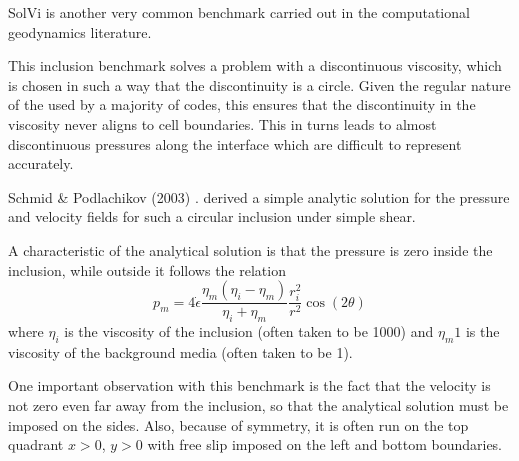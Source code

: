 SolVi is another very common benchmark carried out in the computational 
geodynamics literature.

This inclusion benchmark solves a problem with a discontinuous viscosity, 
which is chosen in such a way that the discontinuity is a circle. 
Given the regular nature of the used by a majority of codes, 
this ensures that the discontinuity in the viscosity never aligns to cell boundaries.
This in turns leads to almost discontinuous pressures along the interface which are difficult 
to represent accurately.

Schmid \& Podlachikov (2003) \cite{scpo03}. 
derived a simple analytic solution for the pressure and velocity fields for such a circular 
inclusion under simple shear.

A characteristic of the analytical solution is that the pressure is zero 
inside the inclusion, while outside it follows the relation
\[
p_m = 4 \dot{\epsilon}
\frac{\eta_m(\eta_i-\eta_m)}{\eta_i+\eta_m}
\frac{r_i^2}{r^2} \cos(2\theta)
\]
where $\eta_i$ is the viscosity of the inclusion (often taken to be 1000)
and $\eta_m1$ is the viscosity of the background media (often taken to be 1). 

One important observation with this benchmark is the fact that the velocity is not zero even far 
away from the inclusion, so that the analytical solution must be imposed on the sides.
Also, because of symmetry, it is often run on the top quadrant $x>0$, $y>0$ with 
free slip imposed on the left and bottom boundaries. 

